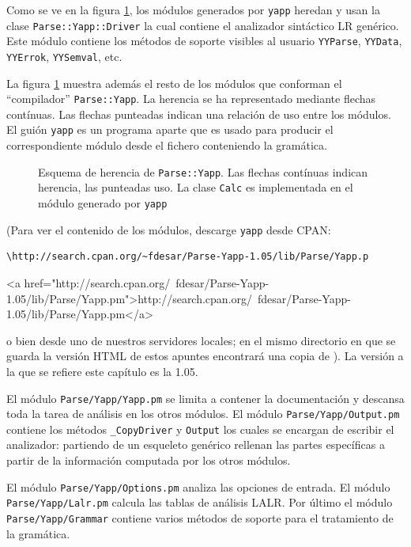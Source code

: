 Como se ve en la figura \ref{fig:yappinheritance}, 
los módulos generados por \verb|yapp|
heredan y usan la clase \verb|Parse::Yapp::Driver|
la  cual contiene el analizador sintáctico LR genérico.
Este módulo contiene los métodos de soporte visibles
al usuario \verb|YYParse|, \verb|YYData|, \verb|YYErrok|, \verb|YYSemval|,
etc.

La figura \ref{fig:yappinheritance} muestra además el 
resto de los módulos
que conforman el ``compilador'' \verb|Parse::Yapp|.
La herencia se ha representado mediante flechas contínuas.
Las flechas punteadas indican una relación de uso entre los módulos.
El guión \verb|yapp| es un programa aparte que es
usado para producir el correspondiente
módulo desde el fichero conteniendo la gramática.

\begin{figure}[htb]
\caption{Esquema de herencia de {\tt Parse::Yapp}. 
Las flechas contínuas indican herencia, las punteadas uso.
La clase {\tt Calc} es implementada en el módulo generado por {\tt yapp}}
\label{fig:yappinheritance}
\end{figure}

(Para ver el contenido de los módulos, descarge \verb|yapp| desde CPAN:
\begin{latexonly}
\begin{verbatim}
\http://search.cpan.org/~fdesar/Parse-Yapp-1.05/lib/Parse/Yapp.p
\end{verbatim}
\end{latexonly}

\begin{rawhtml}
<a href="http://search.cpan.org/~fdesar/Parse-Yapp-1.05/lib/Parse/Yapp.pm">http://search.cpan.org/~fdesar/Parse-Yapp-1.05/lib/Parse/Yapp.pm</a> 
\end{rawhtml}
o bien desde uno de nuestros servidores locales; en 
el mismo directorio en que se guarda la
versión HTML de estos apuntes encontrará una copia de 
).
La versión a la que se refiere este capítulo es la 1.05.

El módulo \verb|Parse/Yapp/Yapp.pm| se limita a contener la documentación
y descansa toda la tarea de análisis en los otros módulos.
El módulo \verb|Parse/Yapp/Output.pm| contiene los métodos
\verb|_CopyDriver| y \verb|Output| los cuales se encargan de escribir
el analizador: partiendo de un esqueleto genérico rellenan 
las partes específicas a partir de la información computada
por los otros módulos. 

El módulo \verb|Parse/Yapp/Options.pm|
analiza las opciones de entrada. El módulo \verb|Parse/Yapp/Lalr.pm|
calcula las tablas de análisis LALR. Por último el módulo
\verb|Parse/Yapp/Grammar| contiene varios métodos de soporte 
para el tratamiento de la gramática.


